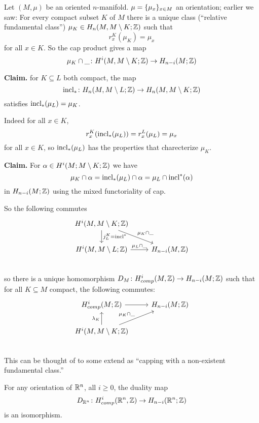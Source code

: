\documentclass[language=english]{TemplateLecture}
\begin{document}
\begin{construction}
    Let \((M, \mu)\) be an oriented \(n\)-manifold. \(\mu = \{\mu_x\}_{x \in M}\) an orientation; earlier we saw: For every compact subset \(K\) of \(M\) there is a unique class (\enquote{relative fundamental class}) \(\mu_K \in H_n(M, M\setminus K; \mathbb{Z})\) such that
    \[r_x^K(\mu_K) = \mu_x\]
    for all \(x \in K\). So the cap product gives a map
    \[\mu_K \cap \_\colon H^i(M, M \setminus K; \mathbb{Z}) \to H_{n-i}(M; \mathbb{Z})\]

    \textbf{Claim.} for \(K \subseteq L\) both compact, the map
    \[\operatorname{incl}_*\colon H_n(M, M\setminus L; \mathbb{Z}) \to H_n(M, M\setminus K; \mathbb{Z})\]
    satisfies \(\operatorname{incl}_*(\mu_L) = \mu_K\).

    Indeed for all \(x \in K\),
    \[r_x^K(\operatorname{incl}_*(\mu_L)) = r_x^L(\mu_L) = \mu_x\]
    for all \(x \in K\), so \(\operatorname{incl}_*(\mu_L)\) has the properties that charecterize \(\mu_K\).

    \textbf{Claim.} For \(\alpha\in H^i(M; M\setminus K; \mathbb{Z})\) we have
    \[\mu_K \cap \alpha = \operatorname{incl}_*(\mu_L) \cap \alpha = \mu_L\cap \operatorname{incl}^*(\alpha) \]
    in \(H_{n-i}(M; \mathbb{Z})\) using the mixed functoriality of cap.

    So the following commutes
    \[\begin{tikzcd}
        H^i(M, M\setminus K; \IZ) \ar[rd, "\mu_K \cap \_"] \ar[d, "j_L^K = \incl^*"] & \\
        H^i(M, M\setminus L; \IZ) \ar[r, "\mu_L \cap \_"] & H_{n-i}(M, \IZ)\\
    \end{tikzcd}\]
    so there is a unique homomorphism \(D_M\colon H^i_{comp}(M, \mathbb{Z}) \to H_{n-i}(M; \mathbb{Z})\) such that for all \(K \subseteq M\) compact, the following commutes:
    \[\begin{tikzcd}
        H_{comp}^i(M; \IZ) \ar[r] & H_{n-i}(M; \IZ) \\
        H^i(M, M\setminus K; \IZ) \ar[u, "\lambda_K"] \ar[ru, "\mu_K \cap \_"] & \\
    \end{tikzcd}\]
    This can be thought of to some extend as \enquote{capping with a non-existent fundamental class.}
\end{construction}

\begin{proposition}
    For any orientation of \(\mathbb{R}^n\), all \(i \geq 0\), the duality map
    \[D_{\mathbb{R}^n}\colon H_{comp}^i(\mathbb{R}^n, \mathbb{Z}) \to H_{n-i}(\mathbb{R}^n; \mathbb{Z})\]
    is an isomorphism.
\end{proposition}
\end{document}
